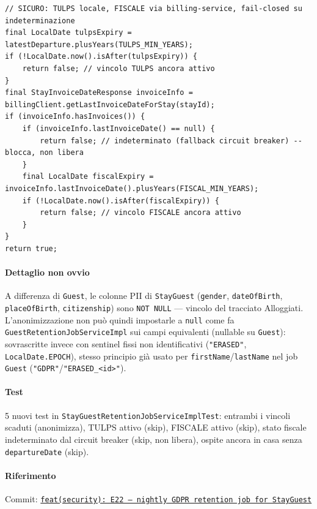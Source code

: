 ﻿\documentclass[a4paper,12pt]{report}
\newcommand{\commitref}[2]{\texttt{\small \href{https://github.com/diegoandruccioli/hotel-pms/commit/#1}{#2}}}
\begin{document}
\begin{securebox}[title={StayGuestRetentionJobServiceImpl.java --- doppio vincolo legale (main)}]
\begin{lstlisting}[style=java]
// SICURO: TULPS locale, FISCALE via billing-service, fail-closed su indeterminazione
final LocalDate tulpsExpiry = latestDeparture.plusYears(TULPS_MIN_YEARS);
if (!LocalDate.now().isAfter(tulpsExpiry)) {
    return false; // vincolo TULPS ancora attivo
}
final StayInvoiceDateResponse invoiceInfo = billingClient.getLastInvoiceDateForStay(stayId);
if (invoiceInfo.hasInvoices()) {
    if (invoiceInfo.lastInvoiceDate() == null) {
        return false; // indeterminato (fallback circuit breaker) -- blocca, non libera
    }
    final LocalDate fiscalExpiry = invoiceInfo.lastInvoiceDate().plusYears(FISCAL_MIN_YEARS);
    if (!LocalDate.now().isAfter(fiscalExpiry)) {
        return false; // vincolo FISCALE ancora attivo
    }
}
return true;
\end{lstlisting}
\end{securebox}

\paragraph{Dettaglio non ovvio}
A differenza di \texttt{Guest}, le colonne PII di \texttt{StayGuest}
(\texttt{gender}, \texttt{dateOfBirth}, \texttt{placeOfBirth},
\texttt{citizenship}) sono \texttt{NOT NULL} --- vincolo del tracciato
Alloggiati. L'anonimizzazione non può quindi impostarle a \texttt{null} come
fa \texttt{GuestRetentionJobServiceImpl} sui campi equivalenti (nullable su
\texttt{Guest}): sovrascritte invece con sentinel fissi non identificativi
(\texttt{"ERASED"}, \texttt{LocalDate.EPOCH}), stesso principio già usato
per \texttt{firstName}/\texttt{lastName} nel job \texttt{Guest}
(\texttt{"GDPR"}/\texttt{"ERASED\_<id>"}).

\paragraph{Test}
5 nuovi test in \texttt{StayGuestRetentionJobServiceImplTest}: entrambi i
vincoli scaduti (anonimizza), TULPS attivo (skip), FISCALE attivo (skip),
stato fiscale indeterminato dal circuit breaker (skip, non libera), ospite
ancora in casa senza \texttt{departureDate} (skip).

\paragraph{Riferimento} Commit: \commitref{fe189c76}{feat(security): E22 -- nightly GDPR retention job for StayGuest}
\end{document}
